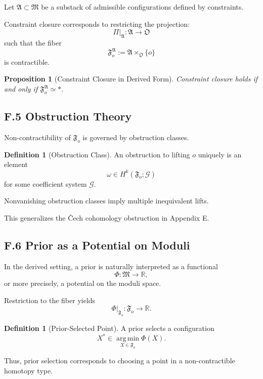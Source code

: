 \documentclass[12pt, oneside]{article}
\theoremstyle{plain}
\newtheorem{proposition}[theorem]{Proposition}
\theoremstyle{definition}
\newtheorem{definition}[theorem]{Definition}
\theoremstyle{remark}
\begin{document}
Let $\mathfrak{A} \subset \mathfrak{M}$ be a substack of admissible configurations defined by constraints.

Constraint closure corresponds to restricting the projection:
\[
\Pi|_{\mathfrak{A}} : \mathfrak{A} \to \mathfrak{O}
\]
such that the fiber
\[
\mathfrak{F}_o^{\mathfrak{A}} := \mathfrak{A} \times_{\mathfrak{O}} \{o\}
\]
is contractible.

\begin{proposition}[Constraint Closure in Derived Form]
Constraint closure holds if and only if $\mathfrak{F}_o^{\mathfrak{A}} \simeq *$.
\end{proposition}

\subsection{F.5 Obstruction Theory}

Non-contractibility of $\mathfrak{F}_o$ is governed by obstruction classes.

\begin{definition}[Obstruction Class]
An obstruction to lifting $o$ uniquely is an element
\[
\omega \in H^k(\mathfrak{F}_o; \mathcal{G})
\]
for some coefficient system $\mathcal{G}$.
\end{definition}

Nonvanishing obstruction classes imply multiple inequivalent lifts.

This generalizes the \v{C}ech cohomology obstruction in Appendix E.

\subsection{F.6 Prior as a Potential on Moduli}

In the derived setting, a prior is naturally interpreted as a functional
\[
\Phi : \mathfrak{M} \to \mathbb{R},
\]
or more precisely, a potential on the moduli space.

Restriction to the fiber yields
\[
\Phi|_{\mathfrak{F}_o} : \mathfrak{F}_o \to \mathbb{R}.
\]

\begin{definition}[Prior-Selected Point]
A prior selects a configuration
\[
X^* \in \operatorname*{arg\,min}_{X \in \mathfrak{F}_o} \Phi(X).
\]
\end{definition}

Thus, prior selection corresponds to choosing a point in a non-contractible homotopy type.
\end{document}
